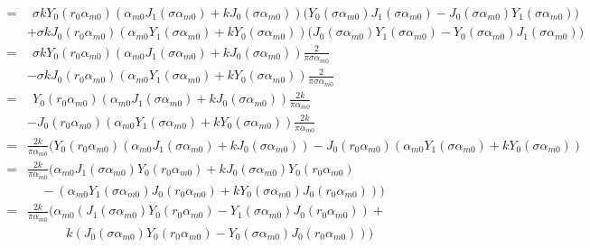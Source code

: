 \documentclass{article}
\begin{document}
\begin{eqnarray}
    &=&   \ \ \sigma kY_0(r_0\alpha_{m0})
          (\alpha_{m0}J_1(\sigma\alpha_{m0}) + kJ_0(\sigma\alpha_{m0}))
          \Big(
          Y_0(\sigma\alpha_{m0})J_1(\sigma\alpha_{m0}) -
          J_0(\sigma\alpha_{m0})Y_1(\sigma\alpha_{m0})
          \Big) \nonumber\\
    & & + \sigma kJ_0(r_0\alpha_{m0})
          (\alpha_{m0}Y_1(\sigma\alpha_{m0}) + kY_0(\sigma\alpha_{m0}))
          \Big(
          J_0(\sigma\alpha_{m0})Y_1(\sigma\alpha_{m0}) -
          Y_0(\sigma\alpha_{m0})J_1(\sigma\alpha_{m0})
          \Big)\nonumber\\
    &=&   \ \ \sigma kY_0(r_0\alpha_{m0})
          (\alpha_{m0}J_1(\sigma\alpha_{m0}) + kJ_0(\sigma\alpha_{m0}))
          \frac{2}{\pi\sigma\alpha_{m0}} \nonumber\\
    & & - \sigma kJ_0(r_0\alpha_{m0})
          (\alpha_{m0}Y_1(\sigma\alpha_{m0}) + kY_0(\sigma\alpha_{m0}))
          \frac{2}{\pi\sigma\alpha_{m0}} \nonumber\\
    &=&   \ \ Y_0(r_0\alpha_{m0})
          (\alpha_{m0}J_1(\sigma\alpha_{m0}) + kJ_0(\sigma\alpha_{m0}))
          \frac{2k}{\pi\alpha_{m0}} \nonumber\\
    & & - J_0(r_0\alpha_{m0})
          (\alpha_{m0}Y_1(\sigma\alpha_{m0}) + kY_0(\sigma\alpha_{m0}))
          \frac{2k}{\pi\alpha_{m0}} \nonumber\\
    &=&   \frac{2k}{\pi\alpha_{m0}}
          (Y_0(r_0\alpha_{m0})
          (\alpha_{m0}J_1(\sigma\alpha_{m0}) + kJ_0(\sigma\alpha_{m0}))
        - J_0(r_0\alpha_{m0})
          (\alpha_{m0}Y_1(\sigma\alpha_{m0}) + kY_0(\sigma\alpha_{m0}))
           \nonumber\\
    &=&   \frac{2k}{\pi\alpha_{m0}}
          (\alpha_{m0}J_1(\sigma\alpha_{m0})Y_0(r_0\alpha_{m0}) + kJ_0(\sigma\alpha_{m0})Y_0(r_0\alpha_{m0})
          \nonumber\\
    & & \ \ \ \ \ 
    -(\alpha_{m0}Y_1(\sigma\alpha_{m0})J_0(r_0\alpha_{m0}) + kY_0(\sigma\alpha_{m0})J_0(r_0\alpha_{m0})))
           \nonumber\\
    &=&   \frac{2k}{\pi\alpha_{m0}} \Big(
          \alpha_{m0}(J_1(\sigma\alpha_{m0})Y_0(r_0\alpha_{m0}) -
                      Y_1(\sigma\alpha_{m0})J_0(r_0\alpha_{m0})) +
                      \nonumber\\
    & &   \ \ \ \ \ \ \ \ \ \ \ \ \ \ k(
            J_0(\sigma\alpha_{m0})Y_0(r_0\alpha_{m0}) -
            Y_0(\sigma\alpha_{m0})J_0(r_0\alpha_{m0}))
          \Big)
\end{eqnarray}
\end{document}
